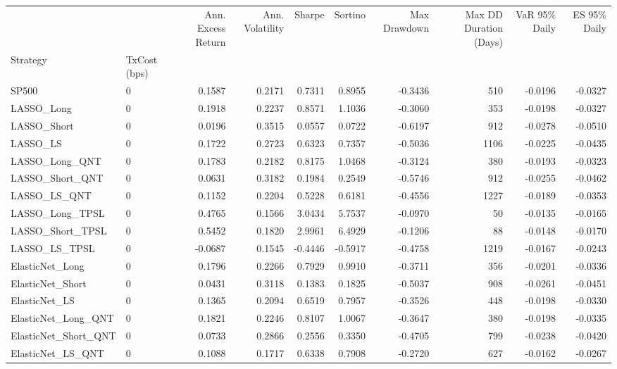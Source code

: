 \begin{tabular}{llrrrrrrrr}
\toprule
 &  & Ann. Excess Return & Ann. Volatility & Sharpe & Sortino & Max Drawdown & Max DD Duration (Days) & VaR 95\% Daily & ES 95\% Daily \\
Strategy & TxCost (bps) &  &  &  &  &  &  &  &  \\
\midrule
SP500 & 0 & 0.1587 & 0.2171 & 0.7311 & 0.8955 & -0.3436 & 510 & -0.0196 & -0.0327 \\
\cline{1-10}
LASSO\_Long & 0 & 0.1918 & 0.2237 & 0.8571 & 1.1036 & -0.3060 & 353 & -0.0198 & -0.0327 \\
\cline{1-10}
LASSO\_Short & 0 & 0.0196 & 0.3515 & 0.0557 & 0.0722 & -0.6197 & 912 & -0.0278 & -0.0510 \\
\cline{1-10}
LASSO\_LS & 0 & 0.1722 & 0.2723 & 0.6323 & 0.7357 & -0.5036 & 1106 & -0.0225 & -0.0435 \\
\cline{1-10}
LASSO\_Long\_QNT & 0 & 0.1783 & 0.2182 & 0.8175 & 1.0468 & -0.3124 & 380 & -0.0193 & -0.0323 \\
\cline{1-10}
LASSO\_Short\_QNT & 0 & 0.0631 & 0.3182 & 0.1984 & 0.2549 & -0.5746 & 912 & -0.0255 & -0.0462 \\
\cline{1-10}
LASSO\_LS\_QNT & 0 & 0.1152 & 0.2204 & 0.5228 & 0.6181 & -0.4556 & 1227 & -0.0189 & -0.0353 \\
\cline{1-10}
LASSO\_Long\_TPSL & 0 & 0.4765 & 0.1566 & 3.0434 & 5.7537 & -0.0970 & 50 & -0.0135 & -0.0165 \\
\cline{1-10}
LASSO\_Short\_TPSL & 0 & 0.5452 & 0.1820 & 2.9961 & 6.4929 & -0.1206 & 88 & -0.0148 & -0.0170 \\
\cline{1-10}
LASSO\_LS\_TPSL & 0 & -0.0687 & 0.1545 & -0.4446 & -0.5917 & -0.4758 & 1219 & -0.0167 & -0.0243 \\
\cline{1-10}
ElasticNet\_Long & 0 & 0.1796 & 0.2266 & 0.7929 & 0.9910 & -0.3711 & 356 & -0.0201 & -0.0336 \\
\cline{1-10}
ElasticNet\_Short & 0 & 0.0431 & 0.3118 & 0.1383 & 0.1825 & -0.5037 & 908 & -0.0261 & -0.0451 \\
\cline{1-10}
ElasticNet\_LS & 0 & 0.1365 & 0.2094 & 0.6519 & 0.7957 & -0.3526 & 448 & -0.0198 & -0.0330 \\
\cline{1-10}
ElasticNet\_Long\_QNT & 0 & 0.1821 & 0.2246 & 0.8107 & 1.0067 & -0.3647 & 380 & -0.0198 & -0.0335 \\
\cline{1-10}
ElasticNet\_Short\_QNT & 0 & 0.0733 & 0.2866 & 0.2556 & 0.3350 & -0.4705 & 799 & -0.0238 & -0.0420 \\
\cline{1-10}
ElasticNet\_LS\_QNT & 0 & 0.1088 & 0.1717 & 0.6338 & 0.7908 & -0.2720 & 627 & -0.0162 & -0.0267 \\

\end{tabular}

